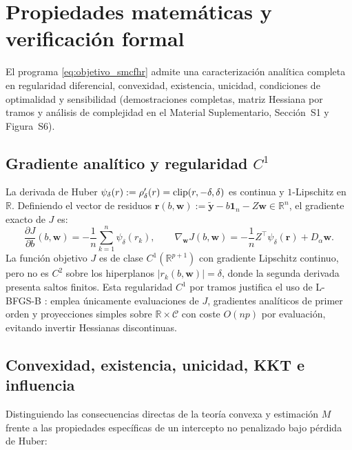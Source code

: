 \section{Propiedades matemáticas y verificación formal}\label{sec:propiedades}

El programa \eqref{eq:objetivo_smcfhr} admite una caracterización analítica completa en regularidad diferencial, convexidad, existencia, unicidad, condiciones de optimalidad y sensibilidad (demostraciones completas, matriz Hessiana por tramos y análisis de complejidad en el Material Suplementario, Sección~S1 y Figura~S6).

\subsection{Gradiente analítico y regularidad $C^1$}

La derivada de Huber $\psi_\delta(r) := \rho_\delta'(r) = \operatorname{clip}(r, -\delta, \delta)$ es continua y $1$-Lipschitz en $\mathbb{R}$. Definiendo el vector de residuos $\mathbf{r}(b, \mathbf{w}) := \tilde{\mathbf{y}} - b\mathbf{1}_n - Z\mathbf{w} \in \mathbb{R}^n$, el gradiente exacto de $J$ es:
\begin{equation}
\frac{\partial J}{\partial b}(b,\mathbf{w}) = -\frac{1}{n}\sum_{k=1}^{n} \psi_\delta(r_k), \qquad
\nabla_{\mathbf{w}} J(b,\mathbf{w}) = -\frac{1}{n} Z^\top \psi_\delta(\mathbf{r}) + D_\alpha \mathbf{w}.
\label{eq:gradiente_smcfhr}
\end{equation}
La función objetivo $J$ es de clase $C^1(\mathbb{R}^{p+1})$ con gradiente Lipschitz continuo, pero no es $C^2$ sobre los hiperplanos $|r_k(b,\mathbf{w})| = \delta$, donde la segunda derivada presenta saltos finitos. Esta regularidad $C^1$ por tramos justifica el uso de L-BFGS-B \cite{byrd1995lbfgsb,zhu1997lbfgsb}: emplea únicamente evaluaciones de $J$, gradientes analíticos de primer orden y proyecciones simples sobre $\mathbb{R} \times \mathcal{C}$ con coste $O(np)$ por evaluación, evitando invertir Hessianas discontinuas.

\subsection{Convexidad, existencia, unicidad, KKT e influencia}

Distinguiendo las consecuencias directas de la teoría convexa \cite{boyd2004convex} y estimación $M$ \cite{huber1964,huber2009robust} frente a las propiedades específicas de un intercepto no penalizado bajo pérdida de Huber:

